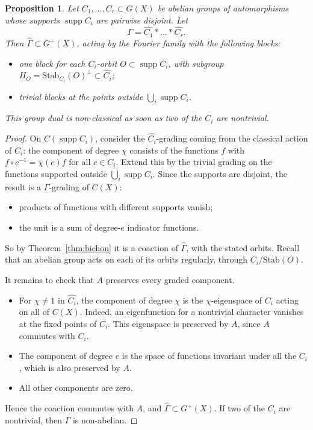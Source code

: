 \documentclass[11pt]{amsart}
\newtheorem{proposition}[theorem]{Proposition}
\theoremstyle{definition}
\theoremstyle{remark}
\theoremstyle{plain}
\numberwithin{equation}{section}
\numberwithin{table}{section}
\DeclareMathOperator{\supp}{supp}
\begin{document}
\begin{proposition}\label{prop:disjoint}
Let $C_1,\dots,C_r\subset G(X)$ be abelian groups of automorphisms whose supports $\supp C_i$ are pairwise disjoint. Let
\[
\Gamma=\widehat{C_1}*\dots*\widehat{C_r}.
\]
Then $\widehat\Gamma\subset G^+(X)$, acting by the Fourier family with the following blocks:
\begin{itemize}
\item one block for each $C_i$-orbit $O\subset\supp C_i$, with subgroup $H_O=\mathrm{Stab}_{C_i}(O)^\perp\subset\widehat{C_i}$;
\item trivial blocks at the points outside $\bigcup_i\supp C_i$.
\end{itemize}
This group dual is non-classical as soon as two of the $C_i$ are nontrivial.
\end{proposition}

\begin{proof}
On $C(\supp C_i)$, consider the $\widehat{C_i}$-grading coming from the classical action of $C_i$: the component of degree $\chi$ consists of the functions $f$ with $f\circ c^{-1}=\chi(c)f$ for all $c\in C_i$. Extend this by the trivial grading on the functions supported outside $\bigcup_i\supp C_i$. Since the supports are disjoint, the result is a $\Gamma$-grading of $C(X)$:
\begin{itemize}
\item products of functions with different supports vanish;
\item the unit is a sum of degree-$e$ indicator functions.
\end{itemize}
So by Theorem~\ref{thm:bichon} it is a coaction of $\widehat\Gamma$, with the stated orbits. Recall that an abelian group acts on each of its orbits regularly, through $C_i/\mathrm{Stab}(O)$.

It remains to check that $A$ preserves every graded component.
\begin{itemize}
\item For $\chi\ne1$ in $\widehat{C_i}$, the component of degree $\chi$ is the $\chi$-eigenspace of $C_i$ acting on all of $C(X)$. Indeed, an eigenfunction for a nontrivial character vanishes at the fixed points of $C_i$. This eigenspace is preserved by $A$, since $A$ commutes with $C_i$.
\item The component of degree $e$ is the space of functions invariant under all the $C_i$, which is also preserved by $A$.
\item All other components are zero.
\end{itemize}
Hence the coaction commutes with $A$, and $\widehat\Gamma\subset G^+(X)$. If two of the $C_i$ are nontrivial, then $\Gamma$ is non-abelian.
\end{proof}
\end{document}

